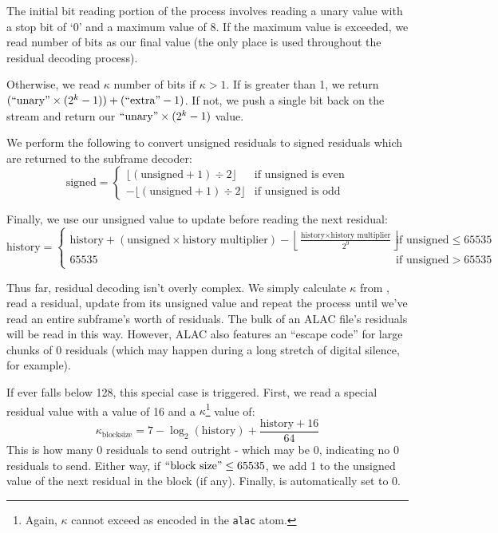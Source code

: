 The initial bit reading portion of the process
involves reading a unary value with a stop bit of `0'
and a maximum value of 8.
If the maximum value is exceeded, we read 
number of bits as our final value
(the only place  is used throughout the
residual decoding process).

Otherwise, we read $\kappa$ number of  bits if $\kappa > 1$.
If  is greater than 1, we return
$(\text{``{unary}''} \times (2^k - 1)) + (\text{``{extra}''} - 1)$.
If not, we push a single  bit back on the stream and return our
$\text{``{unary}''} \times (2^k - 1)$ value.

\clearpage

We perform the following to convert unsigned residuals to signed residuals
which are returned to the subframe decoder:
\begin{equation}
\text{signed} =
\begin{cases}
\lfloor (\text{unsigned} + 1) \div 2 \rfloor & \text{if unsigned is even} \\
-\lfloor (\text{unsigned} + 1) \div 2 \rfloor & \text{if unsigned is odd}
\end{cases}
\end{equation}

Finally, we use our unsigned value to update 
before reading the next residual:
{
\begin{equation*}
\text{history} =
\begin{cases}
\text{history} + (\text{unsigned} \times \text{history multiplier}) - \left\lfloor\frac{\text{history} \times \text{history multiplier}}{2^9}\right\rfloor & \text{if unsigned} \leq 65535 \\
65535 & \text{if unsigned} > 65535
\end{cases}
\end{equation*}
}

Thus far, residual decoding isn't overly complex.
We simply calculate $\kappa$ from , read a residual,
update  from its unsigned value and repeat the process
until we've read an entire subframe's worth of residuals.
The bulk of an ALAC file's residuals will be read in this way.
However, ALAC also features an ``escape code'' for large chunks
of 0 residuals (which may happen during a long stretch of
digital silence, for example).

If  ever falls below 128, this special case is triggered.
First, we read a special  residual value
with a  value of 16 and a $\kappa$\footnote{Again, $\kappa$ cannot exceed  as encoded in the \texttt{alac} atom.} value of:
\begin{equation}
\kappa_{\text{blocksize}} = 7 - \log_2(\text{history}) + \frac{\text{history} + 16}{64}
\end{equation}
This  is how many 0 residuals to send outright -
which may be 0, indicating no 0 residuals to send.
Either way, if $\text{``{block size}''} \leq 65535$,
we add 1 to the unsigned value of the next residual in the block (if any).
Finally,  is automatically set to 0.

